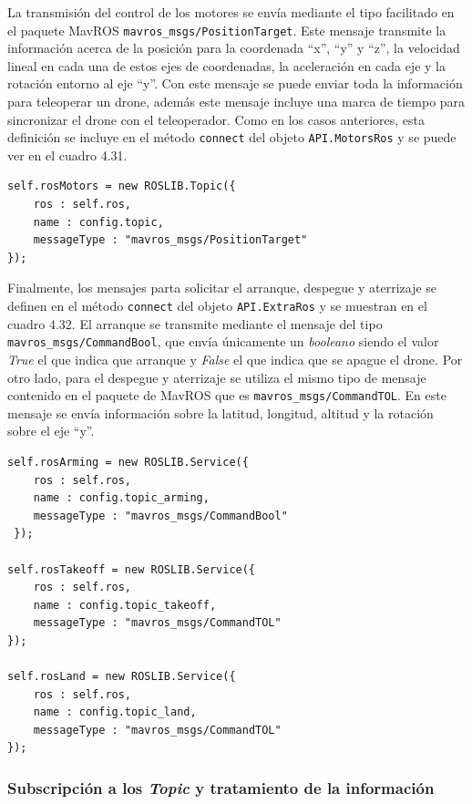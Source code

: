 La transmisión del control de los motores se envía mediante el tipo facilitado en el paquete MavROS \texttt{mavros\_msgs/PositionTarget}. Este mensaje transmite la información acerca de la posición para la coordenada ``x'', ``y'' y ``z'', la velocidad lineal en cada una de estos ejes de coordenadas, la aceleración en cada eje y la rotación entorno al eje ``y''. Con este mensaje se puede enviar toda la información para teleoperar un drone, además este mensaje incluye una marca de tiempo para sincronizar el drone con el teleoperador. Como en los casos anteriores, esta definición se incluye en el método \texttt{connect} del objeto \texttt{API.MotorsRos} y se puede ver en el cuadro 4.31.

\begin{lstlisting}[caption= Definición del mensaje para controlar los motores del drone, label=cod.mensajemotordrone]
self.rosMotors = new ROSLIB.Topic({
	ros : self.ros,
	name : config.topic,
	messageType : "mavros_msgs/PositionTarget"
});
\end{lstlisting}

Finalmente, los mensajes parta solicitar el arranque, despegue y aterrizaje se definen en el método \texttt{connect} del objeto \texttt{API.ExtraRos} y se muestran en el cuadro 4.32. El arranque se transmite mediante el mensaje del tipo \texttt{mavros\_msgs/CommandBool}, que envía únicamente un \textit{booleano} siendo el valor \textit{True} el que indica que arranque y \textit{False} el que indica que se apague el drone. Por otro lado, para el despegue y aterrizaje se utiliza el mismo tipo de mensaje contenido en el paquete de MavROS que es \texttt{mavros\_msgs/CommandTOL}. En este mensaje se envía información sobre la latitud, longitud, altitud y la rotación sobre el eje ``y''.

\begin{lstlisting}[caption= {Definición de los mensajes para arrancar, despegar y aterrizar}, label=cod.mensajeextradrone]
self.rosArming = new ROSLIB.Service({
	ros : self.ros,
	name : config.topic_arming,
	messageType : "mavros_msgs/CommandBool"
 });

self.rosTakeoff = new ROSLIB.Service({
	ros : self.ros,
	name : config.topic_takeoff,
	messageType : "mavros_msgs/CommandTOL"
});

self.rosLand = new ROSLIB.Service({
	ros : self.ros,
	name : config.topic_land,
	messageType : "mavros_msgs/CommandTOL"
});
\end{lstlisting}

\subsubsection{Subscripción a los \textit{Topic} y tratamiento de la información}

